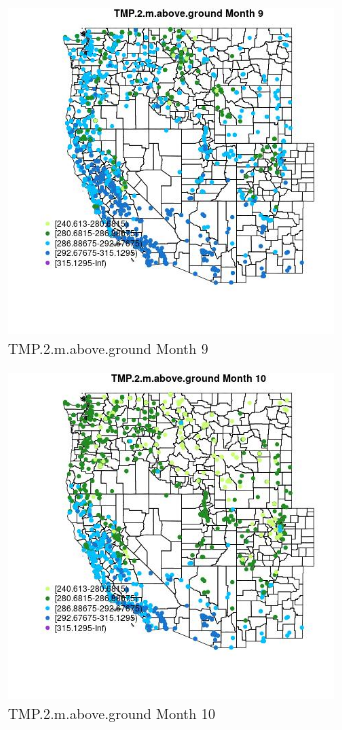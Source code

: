 \begin{figure} 
\centering  
\includegraphics[width=0.77\textwidth]{Code_Outputs/Report_ML_input_PM25_Step4_part_f_de_duplicated_aveswNAs_MapObsMo9TMP2maboveground.jpg} 
\caption{\label{fig:Report_ML_input_PM25_Step4_part_f_de_duplicated_aveswNAsMapObsMo9TMP2maboveground}TMP.2.m.above.ground Month 9} 
\end{figure} 
 

\begin{figure} 
\centering  
\includegraphics[width=0.77\textwidth]{Code_Outputs/Report_ML_input_PM25_Step4_part_f_de_duplicated_aveswNAs_MapObsMo10TMP2maboveground.jpg} 
\caption{\label{fig:Report_ML_input_PM25_Step4_part_f_de_duplicated_aveswNAsMapObsMo10TMP2maboveground}TMP.2.m.above.ground Month 10} 
\end{figure} 
 

